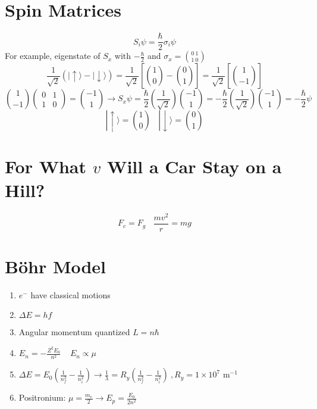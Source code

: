 \documentclass[10pt,a4paper]{article}
\begin{document}
\section{Spin Matrices} %
\label{sec:spin_matrices}
\begin{equation}
    S_i \psi = \frac{\hbar}{2}\sigma_i \psi
\end{equation}
For example, eigenstate of $S_x$ with $-\frac{\hbar}{2}$ and $\sigma_x = \binom{0~1}{1~0}$
\begin{equation}
    \frac{1}{\sqrt{2}} ( | \uparrow \rangle -  | \downarrow \rangle) = \frac{1}{\sqrt{2}}  \left[ \binom{1}{0} - \binom{0}{1} \right] = \frac{1}{\sqrt{2}} \left[ \binom{1}{-1} \right]
\end{equation}
\begin{equation}
    \binom{1}{-1} \begin{pmatrix} 
  0 & 1\\ 
  1 & 0
\end{pmatrix} = \binom{-1}{1} \rightarrow S_x\psi = \frac{\hbar}{2} \left( \frac{1}{\sqrt{2}} \right)  \binom{-1}{1} = -\frac{\hbar}{2} \left( \frac{1}{\sqrt{2}} \right) \binom{-1}{1} = -\frac{\hbar}{2}\psi
\end{equation}
\begin{equation}
    |\uparrow \rangle = \binom{1}{0}~~~~|\downarrow \rangle = \binom{0}{1}
\end{equation}

\section{For What $v$ Will a Car Stay on a Hill?} %
\label{sec:for_what_}
\begin{equation}
    F_c = F_g ~~~~ \frac{mv^2}{r}=mg
\end{equation}

\section{B\"ohr Model} %
\label{sec:bohr_model}
\begin{enumerate}
    \item $e^-$ have classical motions
    \item $\Delta E = hf$
    \item Angular momentum quantized   $L=n\hbar$
    \item $E_n = -\frac{Z^2E_0}{n^2}~~~~~ E_n \propto \mu$
    \item $\Delta E = E_0 \left( \frac{1}{n_f^2}  -\frac{1}{n_i^2} \right) \rightarrow \frac{1}{\lambda} = R_y \left( \frac{1}{n_f^2} - \frac{1}{n_i^2} \right) ~, R_y=1\times10^7$ m$^{-1}$
    \item Positronium: $\mu = \frac{m_e}{2} \rightarrow E_p = \frac{E_0}{2n^2}$
\end{enumerate}
\end{document}
